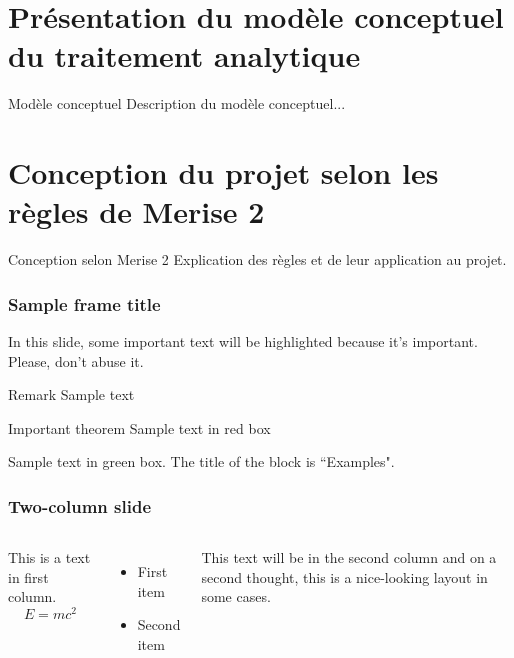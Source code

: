 \documentclass{beamer}
\begin{document}
\section{Présentation du modèle conceptuel du traitement analytique}
\begin{frame}{Modèle conceptuel}
    Description du modèle conceptuel...
\end{frame}



\section{Conception du projet selon les règles de Merise 2}
\begin{frame}{Conception selon Merise 2}
    Explication des règles et de leur application au projet.
\end{frame}



\begin{frame}
\frametitle{Sample frame title}

In this slide, some important text will be
\alert{highlighted} because it's important.
Please, don't abuse it.

\begin{block}{Remark}
Sample text
\end{block}

\begin{alertblock}{Important theorem}
Sample text in red box
\end{alertblock}

\begin{examples}
Sample text in green box. The title of the block is ``Examples".
\end{examples}
\end{frame}



\begin{frame}
\frametitle{Two-column slide}

\begin{columns}

This is a text in first column.
$$E=mc^2$$
\begin{itemize}
\item First item
\item Second item
\end{itemize}

This text will be in the second column
and on a second thought, this is a nice-looking
layout in some cases.
\end{columns}
\end{frame}
\end{document}
